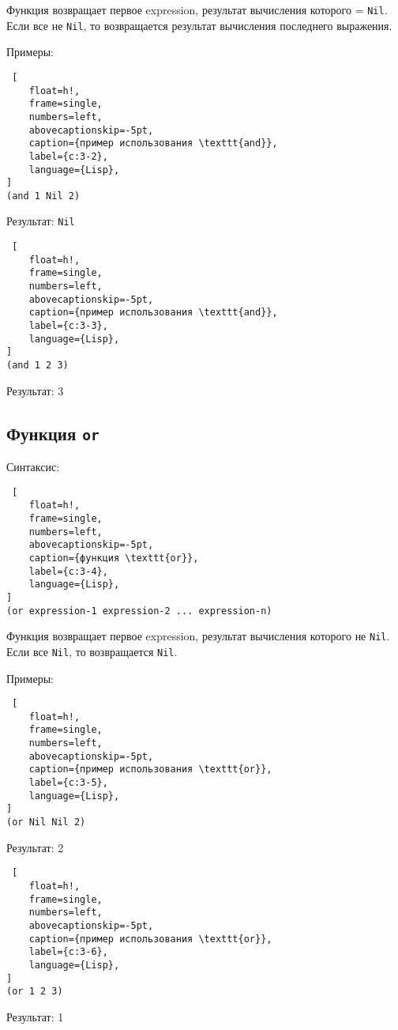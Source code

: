 Функция возвращает первое expression, результат вычисления которого = \texttt{Nil}. Если все не \texttt{Nil}, то возвращается результат вычисления последнего выражения.

\clearpage

Примеры:

\begin{lstlisting} [
	float=h!,
	frame=single,
	numbers=left,
	abovecaptionskip=-5pt,
	caption={пример использования \texttt{and}},
	label={с:3-2},
	language={Lisp},
]
(and 1 Nil 2)
\end{lstlisting}

Результат: \texttt{Nil}

\begin{lstlisting} [
	float=h!,
	frame=single,
	numbers=left,
	abovecaptionskip=-5pt,
	caption={пример использования \texttt{and}},
	label={с:3-3},
	language={Lisp},
]
(and 1 2 3)
\end{lstlisting}

Результат: 3

\subsection{Функция \texttt{or}}

Синтаксис:
\begin{lstlisting} [
	float=h!,
	frame=single,
	numbers=left,
	abovecaptionskip=-5pt,
	caption={функция \texttt{or}},
	label={с:3-4},
	language={Lisp},
]
(or expression-1 expression-2 ... expression-n)
\end{lstlisting}

Функция возвращает первое expression, результат вычисления которого не \texttt{Nil}. Если все \texttt{Nil}, то возвращается \texttt{Nil}.

Примеры:

\begin{lstlisting} [
	float=h!,
	frame=single,
	numbers=left,
	abovecaptionskip=-5pt,
	caption={пример использования \texttt{or}},
	label={с:3-5},
	language={Lisp},
]
(or Nil Nil 2)
\end{lstlisting}

Результат: 2

\begin{lstlisting} [
	float=h!,
	frame=single,
	numbers=left,
	abovecaptionskip=-5pt,
	caption={пример использования \texttt{or}},
	label={с:3-6},
	language={Lisp},
]
(or 1 2 3)
\end{lstlisting}

Результат: 1

